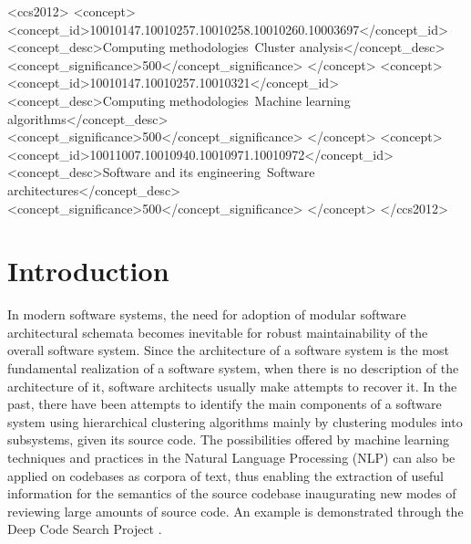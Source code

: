 \documentclass[sigconf,review, anonymous]{acmart}
\begin{document}
%
%
\begin{CCSXML}
<ccs2012>
<concept>
<concept_id>10010147.10010257.10010258.10010260.10003697</concept_id>
<concept_desc>Computing methodologies~Cluster analysis</concept_desc>
<concept_significance>500</concept_significance>
</concept>
<concept>
<concept_id>10010147.10010257.10010321</concept_id>
<concept_desc>Computing methodologies~Machine learning algorithms</concept_desc>
<concept_significance>500</concept_significance>
</concept>
<concept>
<concept_id>10011007.10010940.10010971.10010972</concept_id>
<concept_desc>Software and its engineering~Software architectures</concept_desc>
<concept_significance>500</concept_significance>
</concept>
</ccs2012>
\end{CCSXML}

%



\maketitle

\section{Introduction}




In modern software systems, the need for adoption of modular software architectural schemata 
becomes inevitable for robust maintainability of the overall software system.
Since the architecture of a software system is the most fundamental realization of a 
software system, when there is no description of the architecture of it, software 
architects usually make attempts to recover it. In the past, there have been attempts to 
identify the main components of a software system using hierarchical clustering 
algorithms \cite{maqbool_overview, limbo} mainly by clustering modules into subsystems, given 
its source code.    
The possibilities offered by machine learning techniques and practices in the Natural Language Processing (NLP) 
can also be applied on codebases as corpora of text, thus enabling 
the extraction of useful information for the semantics of the source codebase 
inaugurating new modes of reviewing large amounts of source code.
An example is demonstrated through the Deep Code Search Project \cite{deepcodesearch} .
\end{document}
